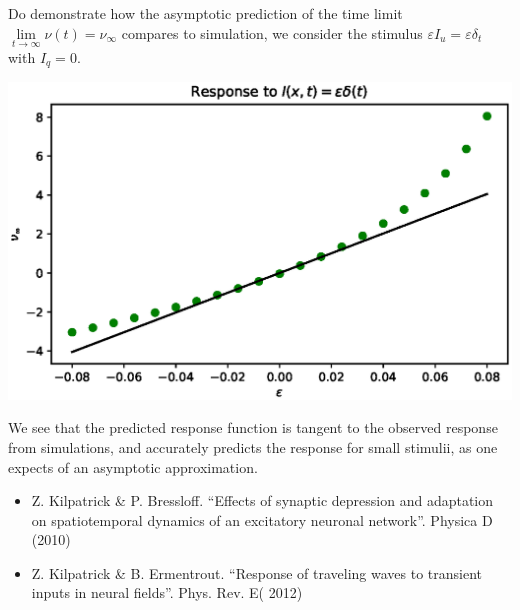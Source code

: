 \documentclass[landscape,final]{baposter}
\begin{document}
\begin{poster}
{	Do demonstrate how the asymptotic prediction of the time limit $\lim\limits_{t \to \infty} \nu(t) = \nu_\infty$ compares to simulation, we consider the stimulus $\varepsilon I_u = \varepsilon \delta_t$ with $I_q = 0$.
	\begin{center}
		\includegraphics[width=.9\linewidth]{fig_spatially_homogeneous_limit}
	\end{center}
	We see that the predicted response function is tangent to the observed response from simulations, and accurately predicts the response for small stimulii, as one expects of an asymptotic approximation.
	\vspace{.2cm}
}

{
	\begin{itemize}
		\item Z. Kilpatrick \& P. Bressloff. ``Effects of synaptic depression and adaptation on
		spatiotemporal dynamics of an excitatory neuronal network''. Physica D (2010)
		\item Z. Kilpatrick \& B. Ermentrout. ``Response of traveling waves to transient inputs in
		neural fields''. Phys. Rev. E( 2012)
	\end{itemize}
}

\end{poster}
\end{document}
